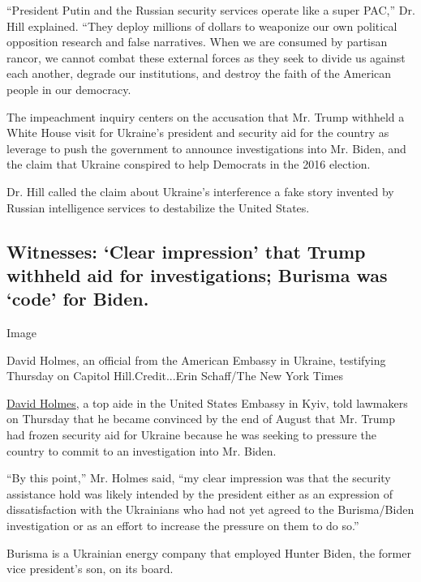 ``President Putin and the Russian security services operate like a super
PAC,'' Dr. Hill explained. ``They deploy millions of dollars to
weaponize our own political opposition research and false narratives.
When we are consumed by partisan rancor, we cannot combat these external
forces as they seek to divide us against each another, degrade our
institutions, and destroy the faith of the American people in our
democracy.

The impeachment inquiry centers on the accusation that Mr. Trump
withheld a White House visit for Ukraine's president and security aid
for the country as leverage to push the government to announce
investigations into Mr. Biden, and the claim that Ukraine conspired to
help Democrats in the 2016 election.

Dr. Hill called the claim about Ukraine's interference a fake story
invented by Russian intelligence services to destabilize the United
States.

\hypertarget{witnesses-clear-impression-that-trump-withheld-aid-for-investigations-burisma-was-code-for-biden}{%
\subsection{Witnesses: `Clear impression' that Trump withheld aid for
investigations; Burisma was `code' for
Biden.}\label{witnesses-clear-impression-that-trump-withheld-aid-for-investigations-burisma-was-code-for-biden}}

Image

David Holmes, an official from the American Embassy in Ukraine,
testifying Thursday on Capitol Hill.Credit...Erin Schaff/The New York
Times

\href{https://www.nytimes.com/2019/11/21/us/politics/david-holmes-impeachment.html}{David
Holmes}, a top aide in the United States Embassy in Kyiv, told lawmakers
on Thursday that he became convinced by the end of August that Mr. Trump
had frozen security aid for Ukraine because he was seeking to pressure
the country to commit to an investigation into Mr. Biden.

``By this point,'' Mr. Holmes said, ``my clear impression was that the
security assistance hold was likely intended by the president either as
an expression of dissatisfaction with the Ukrainians who had not yet
agreed to the Burisma/Biden investigation or as an effort to increase
the pressure on them to do so.''

Burisma is a Ukrainian energy company that employed Hunter Biden, the
former vice president's son, on its board.

